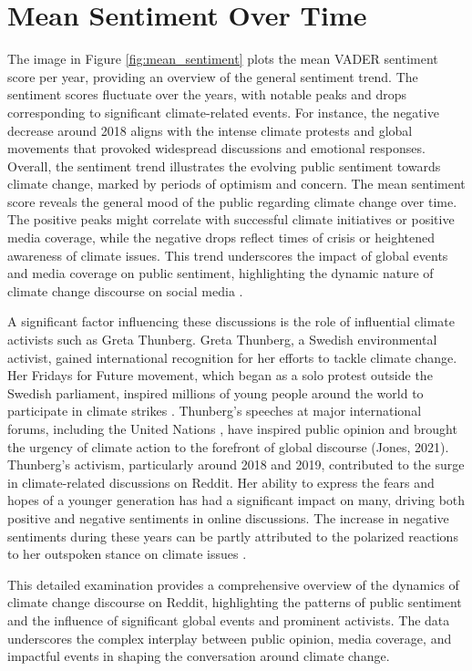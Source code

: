 \section{Mean Sentiment Over Time}
The image in Figure \ref{fig:mean_sentiment} plots the mean VADER sentiment score per year, providing an overview of the general sentiment trend. The sentiment scores fluctuate over the years, with notable peaks and drops corresponding to significant climate-related events. For instance, the negative decrease around 2018 aligns with the intense climate protests and global movements that provoked widespread discussions and emotional responses. Overall, the sentiment trend illustrates the evolving public sentiment towards climate change, marked by periods of optimism and concern.
The mean sentiment score reveals the general mood of the public regarding climate change over time. The positive peaks might correlate with successful climate initiatives or positive media coverage, while the negative drops reflect times of crisis or heightened awareness of climate issues. This trend underscores the impact of global events and media coverage on public sentiment, highlighting the dynamic nature of climate change discourse on social media \cite{Valentini2016}.

A significant factor influencing these discussions is the role of influential climate activists such as Greta Thunberg. Greta Thunberg, a Swedish environmental activist, gained international recognition for her efforts to tackle climate change. Her Fridays for Future movement, which began as a solo protest outside the Swedish parliament, inspired millions of young people around the world to participate in climate strikes \cite{fridaysforfuture2024ruckblick}. Thunberg's speeches at major international forums, including the United Nations \cite{un2019greta}, have inspired public opinion and brought the urgency of climate action to the forefront of global discourse (Jones, 2021).
Thunberg's activism, particularly around 2018 and 2019, contributed to the surge in climate-related discussions on Reddit. Her ability to express the fears and hopes of a younger generation has had a significant impact on many, driving both positive and negative sentiments in online discussions. The increase in negative sentiments during these years can be partly attributed to the polarized reactions to her outspoken stance on climate issues \cite{aidr2024blacksummer}.

This detailed examination provides a comprehensive overview of the dynamics of climate change discourse on Reddit, highlighting the patterns of public sentiment and the influence of significant global events and prominent activists. The data underscores the complex interplay between public opinion, media coverage, and impactful events in shaping the conversation around climate change.

